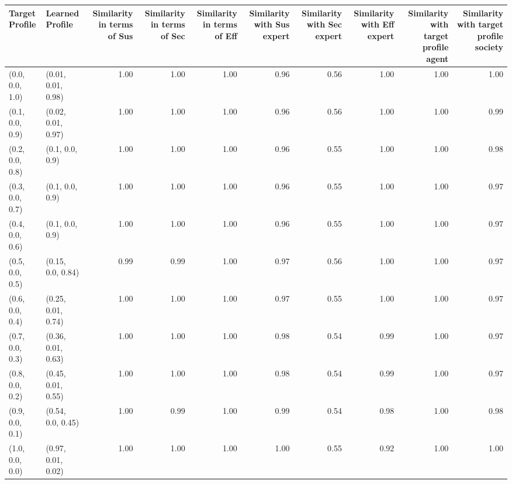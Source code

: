 \begin{tabular}{llrrrrrrrr}
\toprule
Target Profile & Learned Profile & Similarity in terms of Sus & Similarity in terms of Sec & Similarity in terms of Eff & Similarity with Sus expert & Similarity with Sec expert & Similarity with Eff expert & Similarity with target profile agent & Similarity with target profile society \\
\midrule
(0.0, 0.0, 1.0) & (0.01, 0.01, 0.98) & 1.00 & 1.00 & 1.00 & 0.96 & 0.56 & 1.00 & 1.00 & 1.00 \\
(0.1, 0.0, 0.9) & (0.02, 0.01, 0.97) & 1.00 & 1.00 & 1.00 & 0.96 & 0.56 & 1.00 & 1.00 & 0.99 \\
(0.2, 0.0, 0.8) & (0.1, 0.0, 0.9) & 1.00 & 1.00 & 1.00 & 0.96 & 0.55 & 1.00 & 1.00 & 0.98 \\
(0.3, 0.0, 0.7) & (0.1, 0.0, 0.9) & 1.00 & 1.00 & 1.00 & 0.96 & 0.55 & 1.00 & 1.00 & 0.97 \\
(0.4, 0.0, 0.6) & (0.1, 0.0, 0.9) & 1.00 & 1.00 & 1.00 & 0.96 & 0.55 & 1.00 & 1.00 & 0.97 \\
(0.5, 0.0, 0.5) & (0.15, 0.0, 0.84) & 0.99 & 0.99 & 1.00 & 0.97 & 0.56 & 1.00 & 1.00 & 0.97 \\
(0.6, 0.0, 0.4) & (0.25, 0.01, 0.74) & 1.00 & 1.00 & 1.00 & 0.97 & 0.55 & 1.00 & 1.00 & 0.97 \\
(0.7, 0.0, 0.3) & (0.36, 0.01, 0.63) & 1.00 & 1.00 & 1.00 & 0.98 & 0.54 & 0.99 & 1.00 & 0.97 \\
(0.8, 0.0, 0.2) & (0.45, 0.01, 0.55) & 1.00 & 1.00 & 1.00 & 0.98 & 0.54 & 0.99 & 1.00 & 0.97 \\
(0.9, 0.0, 0.1) & (0.54, 0.0, 0.45) & 1.00 & 0.99 & 1.00 & 0.99 & 0.54 & 0.98 & 1.00 & 0.98 \\
(1.0, 0.0, 0.0) & (0.97, 0.01, 0.02) & 1.00 & 1.00 & 1.00 & 1.00 & 0.55 & 0.92 & 1.00 & 1.00 \\
\bottomrule
\end{tabular}
